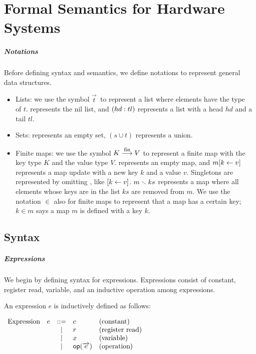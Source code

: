 \chapter{Formal Semantics for Hardware Systems}
\label{chap:semantics}

\paragraph{Notations}

Before defining syntax and semantics, we define notations to represent
general data structures.
\begin{itemize}
\item Lists: we use the symbol $\vec{t}\ $ to represent a list where
  elements have the type of $t$. \listnil{} represents the nil list,
  and $(hd:tl)$ represents a list with a head $hd$ and a
  tail $tl$.
\item Sets: \emptyset{} represents an empty set, $(s \cup t)$
  represents a union.
\item Finite maps: we use the symbol $K \stackrel{\textrm{\footnotesize{fin}}}{\longrightarrow} V$ to represent a
  finite map with the key type $K$ and the value type $V$. \emptymap{}
  represents an empty map, and $m [ k \leftarrow v ]$ represents a map
  update with a new key $k$ and a value $v$. Singletons are
  represented by omitting \emptymap{}, like $ [ k \leftarrow v ]$.
  $m \smallsetminus{} ks$ represents a map where all elements whose keys are
  in the list $ks$ are removed from $m$. We use the notation $\in$
  also for finite maps to represent that a map has a certain key; $k
  \in m$ says a map $m$ is defined with a key $k$.
\end{itemize}

\section{Syntax}

\paragraph{Expressions}
We begin by defining syntax for expressions. Expressions
consist of constant, register read, variable, and an inductive
operation among expressions.

\begin{definition}
  \label{def-expression}
  An expression $e$ is inductively defined as follows:
  \begin{center}
    \begin{math}
      \begin{array}{rcll}
        \textrm{Expression}\quad e & ::= & c & \textrm{(constant)} \\
        & | & r & \textrm{(register read)} \\
        & | & x & \textrm{(variable)} \\
        & | & \textsf{op}{}(\overrightarrow{e}) & \textrm{(operation)} \\
      \end{array}
    \end{math}
  \end{center}
\end{definition}

